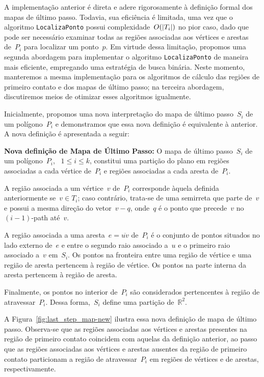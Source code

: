 \documentclass[11pt]{article}
\newenvironment{blockQuote}[1][lightgray]{\begin{mdframed}[
	leftline=true,
	topline=false,
	bottomline=false,
	rightline=false,
	linecolor=gray,
	linewidth=2pt,
	backgroundcolor=#1,
	skipabove=\baselineskip,
	skipbelow=\baselineskip,
	innerleftmargin=10pt,
	innerrightmargin=10pt,
	innertopmargin=5pt,
	innerbottommargin=5pt]
}
{\end{mdframed}}
\DeclarePairedDelimiter{\abs}{\lvert}{\rvert}
\begin{document}
A implementação anterior é direta e adere rigorosamente à definição formal dos mapas de último passo. Todavia, sua eficiência é limitada, uma vez que o algoritmo \texttt{LocalizaPonto} possui complexidade~\(O(\abs{T_i})\) no pior caso, dado que pode ser necessário examinar todas as regiões associadas aos vértices e arestas de~\(P_i\) para localizar um ponto~\(p\). Em virtude dessa limitação, propomos uma segunda abordagem para implementar o algoritmo \texttt{LocalizaPonto} de maneira mais eficiente, empregando uma estratégia de busca binária. Neste momento, manteremos a mesma implementação para os algoritmos de cálculo das regiões de primeiro contato e dos mapas de último passo; na terceira abordagem, discutiremos meios de otimizar esses algoritmos igualmente.

Inicialmente, propomos uma nova interpretação do mapa de último passo~\(S_i\) de um polígono~\(P_i\) e demonstramos que essa nova definição é equivalente à anterior. A nova definição é apresentada a seguir:

\begin{blockQuote}
	
	\textbf{Nova definição de Mapa de Último Passo:} O mapa de último passo~\(S_i\) de um polígono~\(P_i\), ~\(1 \le i \le k\), constitui uma partição do plano em regiões associadas a cada vértice de~\(P_i\) e regiões associadas a cada aresta de~\(P_i\).

	A região associada a um vértice~\(v\) de~\(P_i\) corresponde àquela definida anteriormente se~\(v \in T_i\); caso contrário, trata-se de uma semirreta que parte de~\(v\) e possui a mesma direção do vetor~\(v - q\), onde~\(q\) é o ponto que precede~\(v\) no~\((i - 1)\)-path até~\(v\).

	A região associada a uma aresta~\(e = \overline{uv}\) de~\(P_i\) é o conjunto de pontos situados no lado externo de~\(e\) e entre o segundo raio associado a~\(u\) e o primeiro raio associado a~\(v\) em~\(S_i\). Os pontos na fronteira entre uma região de vértice e uma região de aresta pertencem à região de vértice. Os pontos na parte interna da aresta pertencem à região de aresta.

	Finalmente, os pontos no interior de~\(P_i\) são considerados pertencentes à região de atravessar~\(P_i\). Dessa forma,~\(S_i\) define uma partição de~\(\mathbb{R}^2\).

	A Figura~\ref{fig:last_step_map-new} ilustra essa nova definição de mapa de último passo. Observa-se que as regiões associadas aos vértices e arestas presentes na região de primeiro contato coincidem com aquelas da definição anterior, ao passo que as regiões associadas aos vértices e arestas ausentes da região de primeiro contato particionam a região de atravessar~\(P_i\) em regiões de vértices e de arestas, respectivamente.

\end{blockQuote}
\end{document}
